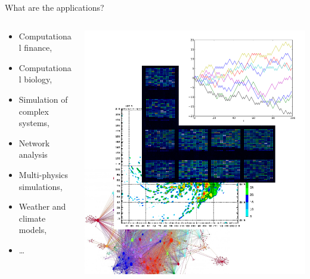 \documentclass[xcolor={svgnames,usenames}]{beamer}
\begin{document}
\begin{frame}{What are the applications?}
	\centering
	\begin{columns}
		\begin{column}{0.5\textwidth}
		\begin{itemize}
		\item Computational finance,
		\item Computational biology,
		\item Simulation of complex systems,
		\item Network analysis
		\item Multi-physics simulations,
		\item Weather and climate models,
		\item \ldots 
		\end{itemize}
		\end{column}
		\begin{column}{0.5\textwidth}
			\includegraphics[width=\columnwidth]{applications.png}
		\end{column}
	\end{columns}
	\vfill
\end{frame}
\end{document}
